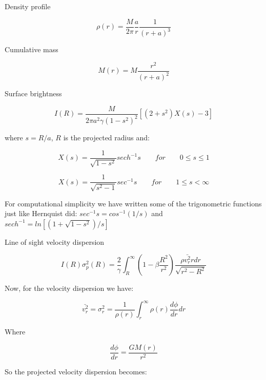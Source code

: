 Density profile

\begin{equation}
\rho(r)=\frac{M}{2\pi}\frac{a}{r}\frac{1}{\left(r+a\right)^{3}}
\end{equation}

Cumulative mass

\begin{equation}
M(r)=M\frac{r^{2}}{(r+a)^{2}}
\end{equation}
 
Surface brightness 
 
 \begin{equation}
 I(R)=\frac{M}{2\pi a^{2}\gamma\left(1-s^{2}\right)^{2}}\left[\left(2+s^{2}\right)X(s)-3\right]
 \end{equation}
 
 where $s=R/a$, $R$ is the projected radius and:

\begin{equation}
X(s)=\frac{1}{\sqrt{1-s^{2}}}sech^{-1}s\qquad for\qquad0\leq s\leq1
\end{equation}

\begin{equation}
X(s)=\frac{1}{\sqrt{s^{2}-1}}sec^{-1}s\qquad for\qquad1\leq s<\infty
\end{equation}

For computational simplicity we have written some of the trigonometric functions just like Hernquist did: $sec^{-1}s = cos^{-1}(1/s)$ and $sech^{-1} = ln[(1+\sqrt{1-s^{2}})/s]$

Line of sight velocity dispersion

 \begin{equation}
 I(R)\sigma_{p}^{2}(R)=\frac{2}{\gamma}\int_{R}^{\infty}\left(1-\beta\frac{R^{2}}{r^{2}}\right)\frac{\rho\bar{v_{r}^{2}}rdr}{\sqrt{r^{2}-R^{2}}}
 \end{equation}

Now, for the velocity dispersion we have:

\begin{equation}
\bar{v_{r}^{2}}=\sigma_{r}^{2}=\frac{1}{\rho(r)}\int_{r}^{\infty}\rho(r)\frac{d\phi}{dr}dr
\end{equation}

Where 

\begin{equation}
\frac{d\phi}{dr}=\frac{GM(r)}{r^{2}}
\end{equation}

So the projected velocity dispersion becomes:

